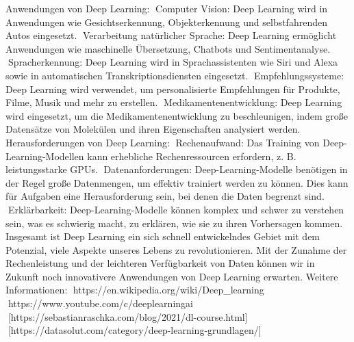 Anwendungen von Deep Learning:
Computer Vision: Deep Learning wird in Anwendungen wie Gesichtserkennung, Objekterkennung und selbstfahrenden Autos eingesetzt.
Verarbeitung natürlicher Sprache: Deep Learning ermöglicht Anwendungen wie maschinelle Übersetzung, Chatbots und Sentimentanalyse.
Spracherkennung: Deep Learning wird in Sprachassistenten wie Siri und Alexa sowie in automatischen Transkriptionsdiensten eingesetzt.
Empfehlungssysteme: Deep Learning wird verwendet, um personalisierte Empfehlungen für Produkte, Filme, Musik und mehr zu erstellen.
Medikamentenentwicklung: Deep Learning wird eingesetzt, um die Medikamentenentwicklung zu beschleunigen, indem große Datensätze von Molekülen und ihren Eigenschaften analysiert werden.
Herausforderungen von Deep Learning:
Rechenaufwand: Das Training von Deep-Learning-Modellen kann erhebliche Rechenressourcen erfordern, z. B. leistungsstarke GPUs.
Datenanforderungen: Deep-Learning-Modelle benötigen in der Regel große Datenmengen, um effektiv trainiert werden zu können. Dies kann für Aufgaben eine Herausforderung sein, bei denen die Daten begrenzt sind.
Erklärbarkeit: Deep-Learning-Modelle können komplex und schwer zu verstehen sein, was es schwierig macht, zu erklären, wie sie zu ihren Vorhersagen kommen.
Insgesamt ist Deep Learning ein sich schnell entwickelndes Gebiet mit dem Potenzial, viele Aspekte unseres Lebens zu revolutionieren. Mit der Zunahme der Rechenleistung und der leichteren Verfügbarkeit von Daten können wir in Zukunft noch innovativere Anwendungen von Deep Learning erwarten.
Weitere Informationen:
https://en.wikipedia.org/wiki/Deep_learning
https://www.youtube.com/c/deeplearningai
[https://sebastianraschka.com/blog/2021/dl-course.html]
[https://datasolut.com/category/deep-learning-grundlagen/]





